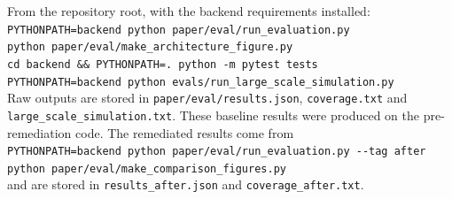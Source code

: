 \documentclass[conference]{IEEEtran}
\begin{document}
From the repository root, with the backend requirements installed:\\
\texttt{PYTHONPATH=backend python paper/eval/run\_evaluation.py}\\
\texttt{python paper/eval/make\_architecture\_figure.py}\\
\texttt{cd backend \&\& PYTHONPATH=. python -m pytest tests}\\
\texttt{PYTHONPATH=backend python evals/run\_large\_scale\_simulation.py}\\
Raw outputs are stored in \texttt{paper/eval/results.json}, \texttt{coverage.txt} and \texttt{large\_scale\_simulation.txt}. These baseline results were produced on the pre-remediation code. The remediated results come from\\
\texttt{PYTHONPATH=backend python paper/eval/run\_evaluation.py -{}-tag after}\\
\texttt{python paper/eval/make\_comparison\_figures.py}\\
and are stored in \texttt{results\_after.json} and \texttt{coverage\_after.txt}.
\end{document}
